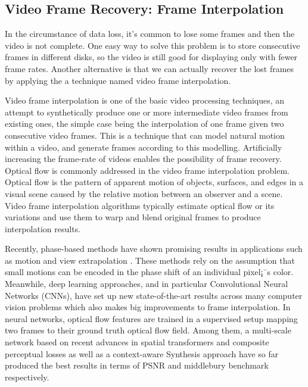 \documentclass[conference]{IEEEtran}
\begin{document}
\subsection{Video Frame Recovery: Frame Interpolation}
In the circumstance of data loss, it's common to lose some frames and then the video is not complete. One easy way to solve this problem is to store consecutive frames in different disks, so the video is still good for displaying only with fewer frame rates. Another alternative is that we can actually recover the lost frames by applying the a technique named video frame interpolation.

Video frame interpolation is one of the basic video processing techniques, an attempt to synthetically produce one or more intermediate video frames from existing ones, the simple case being the interpolation of one frame given two consecutive video frames. This is a technique that can model natural motion within a video, and generate frames according to this modelling. Artificially increasing the frame-rate of videos enables the possibility of frame recovery. Optical flow is commonly addressed in the video frame interpolation problem. Optical flow is the pattern of apparent motion of objects, surfaces, and edges in a visual scene caused by the relative motion between an observer and a scene. Video frame interpolation algorithms typically estimate optical flow or its variations and use them to warp and blend original frames to produce interpolation results.

Recently, phase-based methods have shown promising results in applications such as motion and view extrapolation \cite{didyk2013joint}\cite{wadhwa2013phase}\cite{meyer2015phase}. These methods rely on the assumption that small motions can be encoded in the phase shift of an individual pixel¡¯s color. Meanwhile, deep learning approaches, and in particular Convolutional Neural Networks (CNNs), have set up new state-of-the-art results across many computer vision problems which also makes big improvements to frame interpolation. In neural networks, optical flow features are trained in a supervised setup mapping two frames to their ground truth optical flow field\cite{dosovitskiy2015flownet}\cite{ilg2017flownet}. Among them, a multi-scale network\cite{van2017frame} based on recent advances in spatial transformers and composite perceptual losses as well as a context-aware Synthesis approach\cite{niklaus2018context} have so far produced the best results in terms of PSNR and middlebury benchmark respectively.
\end{document}
